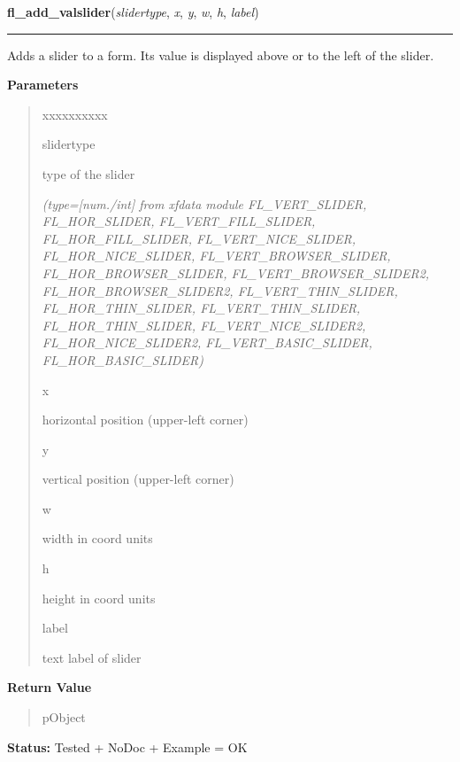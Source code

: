 \hspace{.8\funcindent}\begin{boxedminipage}{\funcwidth}

    \raggedright \textbf{fl\_add\_valslider}(\textit{slidertype}, \textit{x}, \textit{y}, \textit{w}, \textit{h}, \textit{label})

    \vspace{-1.5ex}

    \rule{\textwidth}{0.5\fboxrule}
\setlength{\parskip}{2ex}
    Adds a slider to a form. Its value is displayed above or to the left of
    the slider.

\setlength{\parskip}{1ex}
      \textbf{Parameters}
      \vspace{-1ex}

      \begin{quote}
        \begin{Ventry}{xxxxxxxxxx}

          \item[slidertype]

          type of the slider

            {\it (type=[num./int] from xfdata module FL\_VERT\_SLIDER, FL\_HOR\_SLIDER, 
FL\_VERT\_FILL\_SLIDER, FL\_HOR\_FILL\_SLIDER, FL\_VERT\_NICE\_SLIDER, 
FL\_HOR\_NICE\_SLIDER, FL\_VERT\_BROWSER\_SLIDER, FL\_HOR\_BROWSER\_SLIDER,
FL\_VERT\_BROWSER\_SLIDER2, FL\_HOR\_BROWSER\_SLIDER2, 
FL\_VERT\_THIN\_SLIDER, FL\_HOR\_THIN\_SLIDER, FL\_VERT\_THIN\_SLIDER, 
FL\_HOR\_THIN\_SLIDER, FL\_VERT\_NICE\_SLIDER2, FL\_HOR\_NICE\_SLIDER2, 
FL\_VERT\_BASIC\_SLIDER, FL\_HOR\_BASIC\_SLIDER)}

          \item[x]

          horizontal position (upper-left corner)

          \item[y]

          vertical position (upper-left corner)

          \item[w]

          width in coord units

          \item[h]

          height in coord units

          \item[label]

          text label of slider

        \end{Ventry}

      \end{quote}

      \textbf{Return Value}
    \vspace{-1ex}

      \begin{quote}
      pObject

      \end{quote}

\textbf{Status:} Tested + NoDoc + Example = OK



    \end{boxedminipage}

